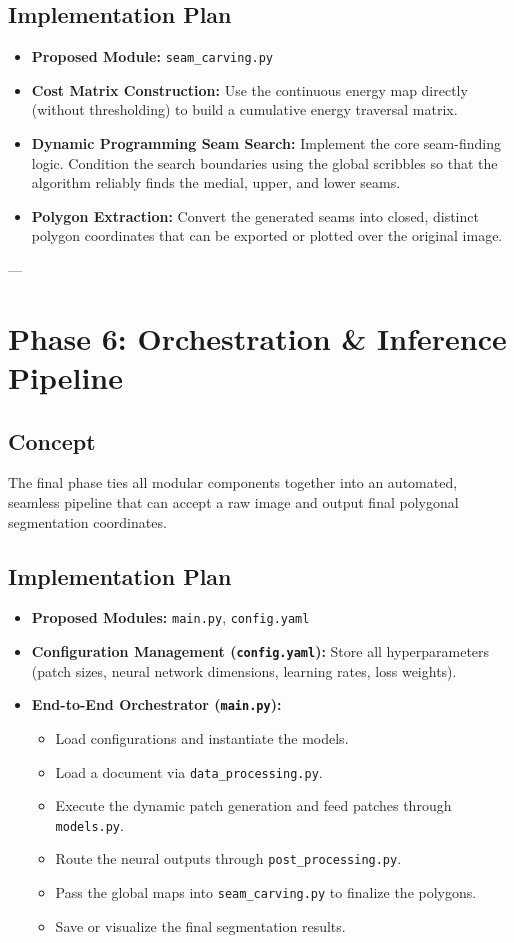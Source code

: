 \documentclass[12pt,a4paper]{article}
\begin{document}
\subsection{Implementation Plan}
\begin{itemize}
    \item \textbf{Proposed Module:} \texttt{seam\_carving.py}
    \item \textbf{Cost Matrix Construction:} Use the continuous energy map directly (without thresholding) to build a cumulative energy traversal matrix.
    \item \textbf{Dynamic Programming Seam Search:} Implement the core seam-finding logic. Condition the search boundaries using the global scribbles so that the algorithm reliably finds the medial, upper, and lower seams.
    \item \textbf{Polygon Extraction:} Convert the generated seams into closed, distinct polygon coordinates that can be exported or plotted over the original image.
\end{itemize}

---

\section{Phase 6: Orchestration \& Inference Pipeline}

\subsection{Concept}
The final phase ties all modular components together into an automated, seamless pipeline that can accept a raw image and output final polygonal segmentation coordinates.

\subsection{Implementation Plan}
\begin{itemize}
    \item \textbf{Proposed Modules:} \texttt{main.py}, \texttt{config.yaml}
    \item \textbf{Configuration Management (\texttt{config.yaml}):} Store all hyperparameters (patch sizes, neural network dimensions, learning rates, loss weights).
    \item \textbf{End-to-End Orchestrator (\texttt{main.py}):} 
    \begin{itemize}
        \item Load configurations and instantiate the models.
        \item Load a document via \texttt{data\_processing.py}.
        \item Execute the dynamic patch generation and feed patches through \texttt{models.py}.
        \item Route the neural outputs through \texttt{post\_processing.py}.
        \item Pass the global maps into \texttt{seam\_carving.py} to finalize the polygons.
        \item Save or visualize the final segmentation results.
    \end{itemize}
\end{itemize}
\end{document}
